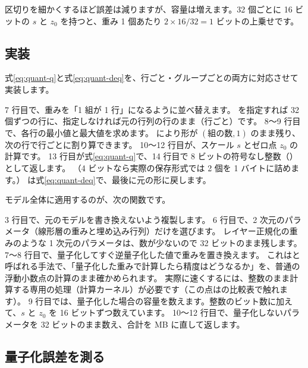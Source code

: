 区切りを細かくするほど誤差は減りますが、容量は増えます。32 個ごとに 16 ビットの $s$ と $z_0$ を持つと、重み 1 個あたり $2\times16/32=1$ ビットの上乗せです。

\subsection{実装}\label{sec:distill-quant-impl}

式\eqref{eq:quant-q}と式\eqref{eq:quant-deq}を、行ごと・グループごとの両方に対応させて実装します。


7 行目で、重みを「1 組が 1 行」になるように並べ替えます。
 を指定すれば 32 個ずつの行に、指定しなければ元の行列の行のまま（行ごと）です。
8〜9 行目で、各行の最小値と最大値を求めます。
 により形が $(\text{組の数}, 1)$ のまま残り、次の行で行ごとに割り算できます。
10〜12 行目が、スケール $s$ とゼロ点 $z_0$ の計算です。
13 行目が式\eqref{eq:quant-q}で、14 行目で 8 ビットの符号なし整数（）として返します。
（4 ビットなら実際の保存形式では 2 個を 1 バイトに詰めます。）
 は式\eqref{eq:quant-deq}で、最後に元の形に戻します。

モデル全体に適用するのが、次の関数です。


3 行目で、元のモデルを書き換えないよう複製します。
6 行目で、2 次元のパラメータ（線形層の重みと埋め込み行列）だけを選びます。
レイヤー正規化の重みのような 1 次元のパラメータは、数が少ないので 32 ビットのまま残します。
7〜8 行目で、量子化してすぐ逆量子化した値で重みを置き換えます。
これはと呼ばれる手法で、「量子化した重みで計算したら精度はどうなるか」を、普通の浮動小数点の計算のまま確かめられます。
実際に速くするには、整数のまま計算する専用の処理（計算カーネル）が必要です（この点はの比較表で触れます）。
9 行目では、量子化した場合の容量を数えます。整数のビット数に加えて、$s$ と $z_0$ を 16 ビットずつ数えています。
10〜12 行目で、量子化しないパラメータを 32 ビットのまま数え、合計を MB に直して返します。

\subsection{量子化誤差を測る}\label{sec:distill-quant-err}

